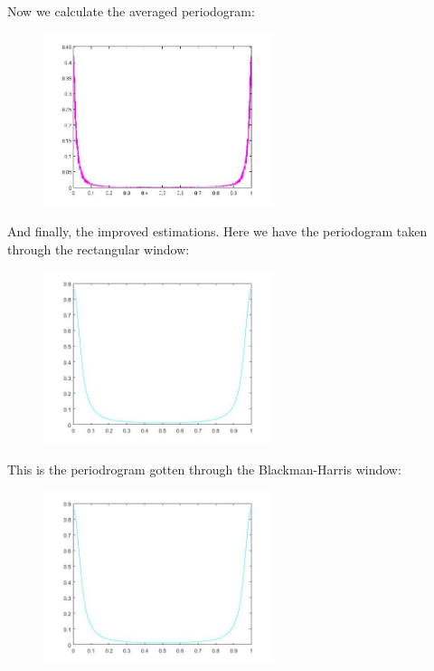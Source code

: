 \documentclass[a4paper,11pt]{article}
\begin{document}
\newpage

Now we calculate the averaged periodogram:

\begin{figure}[!hp]
    \begin{center}
    \includegraphics[width=0.6\textwidth]{images/lab2_redo_figure16.jpg}
    \end{center}
\end{figure}

And finally, the improved estimations. Here we have the periodogram taken through the rectangular window:

\begin{figure}[!hp]
    \begin{center}
    \includegraphics[width=0.6\textwidth]{images/lab2_figure10.jpg}
    \end{center}
\end{figure}

\newpage

This is the periodrogram gotten through the Blackman-Harris window:

\begin{figure}[!hp]
    \begin{center}
    \includegraphics[width=0.6\textwidth]{images/lab2_figure12.jpg}
    \end{center}
\end{figure}
\end{document}
